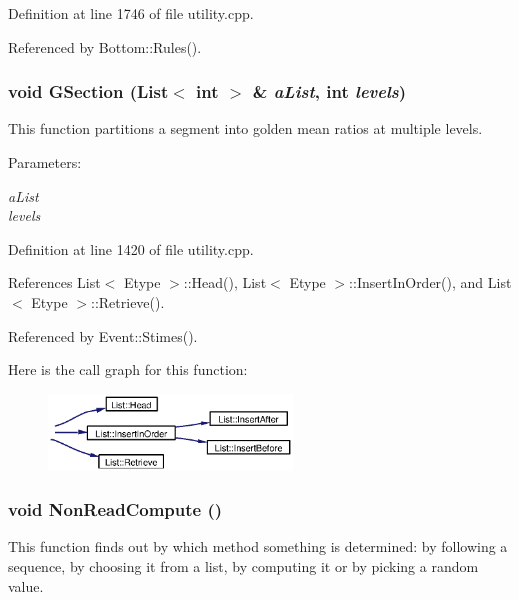 Definition at line 1746 of file utility.cpp.

Referenced by Bottom::Rules().
\subsubsection{\setlength{\rightskip}{0pt plus 5cm}void GSection ({\bf List}$<$ int $>$ \& {\em a\-List}, int {\em levels})}\label{utility_8cpp_a23}


This function partitions a segment into golden mean ratios at multiple levels. \begin{Desc}
\item[Parameters:]
\begin{description}
\item[{\em a\-List}]\item[{\em levels}]\end{description}
\end{Desc}


Definition at line 1420 of file utility.cpp.

References List$<$ Etype $>$::Head(), List$<$ Etype $>$::Insert\-In\-Order(), and List$<$ Etype $>$::Retrieve().

Referenced by Event::Stimes().

Here is the call graph for this function:\begin{figure}[H]
\begin{center}
\leavevmode
\includegraphics[width=184pt]{utility_8cpp_a23_cgraph}
\end{center}
\end{figure}
\subsubsection{\setlength{\rightskip}{0pt plus 5cm}void Non\-Read\-Compute ()}\label{utility_8cpp_a13}


This function finds out by which method something is determined: by following a sequence, by choosing it from a list, by computing it or by picking a random value. 

